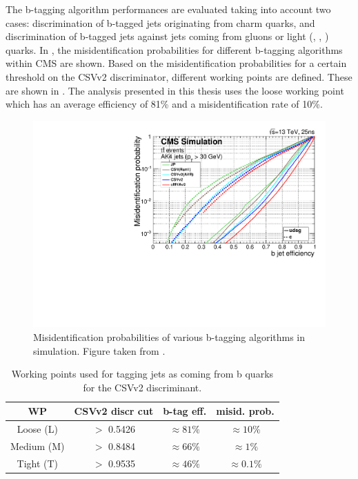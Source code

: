 The b-tagging algorithm performances are evaluated taking into account two cases: discrimination of b-tagged jets originating from charm quarks, and discrimination of b-tagged jets against jets coming from gluons or light (\Pup, \Pdown, \Pstrange) quarks. In , the misidentification probabilities for different b-tagging algorithms within CMS are shown.
Based on the misidentification probabilities for a certain threshold on the CSVv2 discriminator, different working points  are defined. These are shown in . The analysis presented in this thesis uses the loose working point which has an average efficiency of 81\% and a misidentification rate of 10\%. 
\begin{figure}[htbp]
	\centering
	\includegraphics[width=0.7\linewidth]{4_EventRecoSelect/Figures/Figure_008}
	\caption{Misidentification probabilities of various b-tagging algorithms in simulation. Figure taken from \cite{CMS-PAS-BTV-15-001}. }
	\label{fig:figure008}
\end{figure}
\begin{table}[htbp]
	\centering
	\caption{Working points used for tagging jets as coming from b quarks for the CSVv2 discriminant.}
	\begin{tabular}{cccc}
		\toprule
		WP  & CSVv2 discr cut & b-tag eff. & misid. prob. \\ 
		\midrule
		Loose (L) & $>$ 0.5426 & $\approx 81\%$ &  $\approx 10\%$ \\ 
	
		Medium (M)& $>$ 0.8484 & $\approx 66\%$ &  $\approx 1\%$\\ 
		
		Tight (T) & $>$ 0.9535 & $\approx 46\%$ &  $\approx 0.1\%$\\ 
		\bottomrule
	\end{tabular} 
	\label{tab:bctag}	
\end{table}

